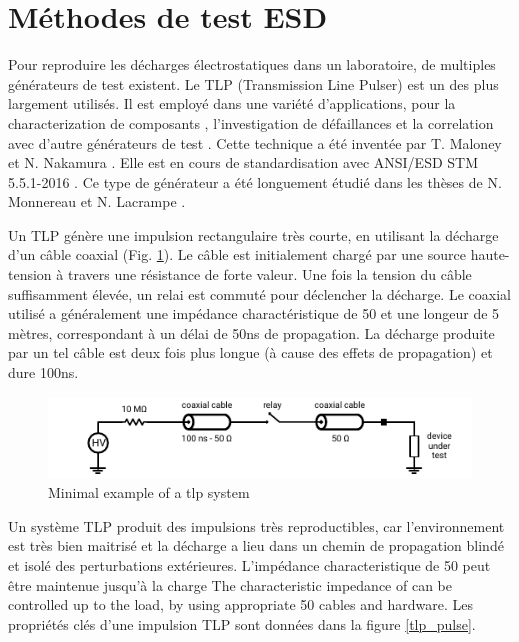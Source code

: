 \section{Méthodes de test ESD}

Pour reproduire les décharges électrostatiques dans un laboratoire, de multiples générateurs de test existent.
Le TLP (Transmission Line Pulser) est un des plus largement utilisés.
Il est employé dans une variété d'applications, pour la characterization de composants \cite{TLPforESDProtectionCz, TLPthroubleshooting}, l'investigation de défaillances \cite{tlp-application-1, tlp-application-2} et la correlation avec d'autre générateurs de test \cite{correlation-system-level-esd-tlp}.
Cette technique a été inventée par T. Maloney et N. Nakamura \cite{TLP}.
Elle est en cours de standardisation avec ANSI/ESD STM 5.5.1-2016 \cite{tlp-standard}.
Ce type de générateur a été longuement étudié dans les thèses de N. Monnereau \cite{phd-monnereau} et N. Lacrampe \cite{phd-lacrampe}.

Un TLP génère une impulsion rectangulaire très courte, en utilisant la décharge d'un câble coaxial (Fig. \ref{tlp_concept}).
Le câble est initialement chargé par une source haute-tension à travers une résistance de forte valeur.
Une fois la tension du câble suffisamment élevée, un relai est commuté pour déclencher la décharge.
Le coaxial utilisé a généralement une impédance charactéristique de 50\textOmega{} et une longeur de 5 mètres, correspondant à un délai de 50ns de propagation.
La décharge produite par un tel câble est deux fois plus longue (à cause des effets de propagation) et dure 100ns.

\begin{figure}[!h]
  \centering
  \includegraphics[width=\textwidth]{src/1/figures/tlp_concept.pdf}
  \caption{Minimal example of a \gls{tlp} system}
  \label{tlp_concept}
\end{figure}

Un système TLP produit des impulsions très reproductibles, car l'environnement est très bien maitrisé et la décharge a lieu dans un chemin de propagation blindé et isolé des perturbations extérieures.
L'impédance characteristique de 50\textOmega{} peut être maintenue jusqu'à la charge The characteristic impedance of  can be controlled up to the load, by using appropriate 50\textOmega{} cables and hardware.
Les propriétés clés d'une impulsion TLP sont données dans la figure \ref{tlp_pulse}.

